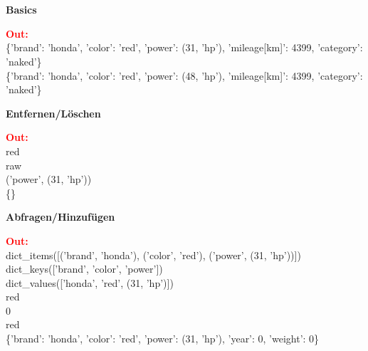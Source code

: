 \\
\vspace{0.5cm}
\\\vspace{0.1cm}
\textbf{Basics}
\\
\begin{minipage}[h]{10cm}
	
\end{minipage}
\begin{minipage}[h]{8cm}
	\textcolor{red}{\textbf{Out:}} \\
	\{'brand': 'honda', 'color': 'red', 'power': (31, 'hp'), 'mileage[km]': 4399, 'category': 'naked'\}
	\\\{'brand': 'honda', 'color': 'red', 'power': (48, 'hp'), 'mileage[km]': 4399, 'category': 'naked'\}
\end{minipage}
\newpage
\hspace{-0.5cm}
\textbf{Entfernen/Löschen}
\\
\begin{minipage}[h]{10cm}
	
\end{minipage}
\begin{minipage}[h]{8cm}
	\textcolor{red}{\textbf{Out:}}
	\\red
	\\raw
	\\('power', (31, 'hp'))
	\\\{\}
\end{minipage}

\hspace{-0.5cm}
\textbf{Abfragen/Hinzufügen}
\\
\begin{minipage}[h]{10cm}
	
\end{minipage}
\begin{minipage}[h]{8cm}
	\textcolor{red}{\textbf{Out:}}
	\\dict\_items([('brand', 'honda'), ('color', 'red'), ('power', (31, 'hp'))])
	\\dict\_keys(['brand', 'color', 'power'])
	\\dict\_values(['honda', 'red', (31, 'hp')])
	\\red
	\\0
	\\red
	\\\{'brand': 'honda', 'color': 'red', 'power': (31, 'hp'), 'year': 0, 'weight': 0\}
\end{minipage}
